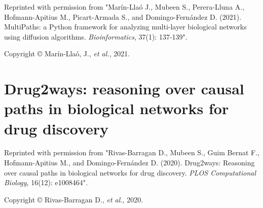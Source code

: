 \vspace*{2cm}

\noindent
Reprinted with permission from "Marín-Llaó J., Mubeen S., Perera-Lluna A., Hofmann-Apitius M., Picart-Armada S., and Domingo-Fern\'{a}ndez D. (2021). MultiPaths: a Python framework for analyzing multi-layer biological networks using diffusion algorithms. \textit{Bioinformatics}, 37(1): 137-139".

\noindent
Copyright © Marín-Llaó, J., \textit{et al.}, 2021.





\section{Drug2ways: reasoning over causal paths in biological networks for drug discovery}
\label{ap:drug2ways}

\vspace*{2cm}

\noindent
Reprinted with permission from "Rivas-Barragan D., Mubeen S., Guim Bernat F., Hofmann-Apitius M., and Domingo-Fern\'{a}ndez D. (2020). Drug2ways: Reasoning over causal paths in biological networks for drug discovery. \textit{PLOS Computational Biology}, 16(12): e1008464".

\noindent
Copyright © Rivas-Barragan D., \textit{et al.}, 2020.


